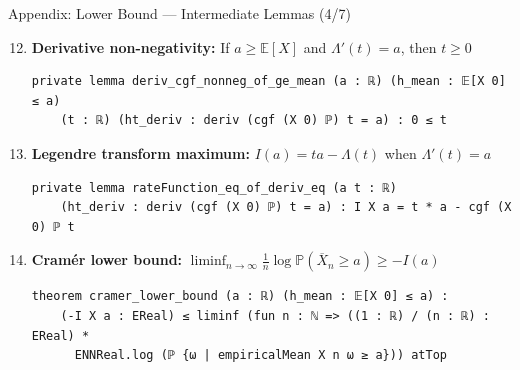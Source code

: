 \documentclass[aspectratio=169]{beamer}
\newcommand{\E}{\mathbb{E}}
\renewcommand{\P}{\mathbb{P}}
\begin{document}
\begin{frame}[fragile]{Appendix: Lower Bound --- Intermediate Lemmas (4/7)}
  \begin{enumerate}\setcounter{enumi}{11}
    \item \textbf{Derivative non-negativity:} If $a \ge \E[X]$ and $\Lambda'(t) = a$, then $t \ge 0$
\begin{lstlisting}[basicstyle=\ttfamily\tiny]
private lemma deriv_cgf_nonneg_of_ge_mean (a : ℝ) (h_mean : 𝔼[X 0] ≤ a)
    (t : ℝ) (ht_deriv : deriv (cgf (X 0) ℙ) t = a) : 0 ≤ t
\end{lstlisting}
    \item \textbf{Legendre transform maximum:} $I(a) = ta - \Lambda(t)$ when $\Lambda'(t) = a$
\begin{lstlisting}[basicstyle=\ttfamily\tiny]
private lemma rateFunction_eq_of_deriv_eq (a t : ℝ)
    (ht_deriv : deriv (cgf (X 0) ℙ) t = a) : I X a = t * a - cgf (X 0) ℙ t
\end{lstlisting}
    \item \textbf{Cram\'er lower bound:} $\liminf_{n\to\infty} \frac{1}{n}\log\P(\overline{X}_n \ge a) \ge -I(a)$
\begin{lstlisting}[basicstyle=\ttfamily\tiny]
theorem cramer_lower_bound (a : ℝ) (h_mean : 𝔼[X 0] ≤ a) :
    (-I X a : EReal) ≤ liminf (fun n : ℕ => ((1 : ℝ) / (n : ℝ) : EReal) *
      ENNReal.log (ℙ {ω | empiricalMean X n ω ≥ a})) atTop
\end{lstlisting}
  \end{enumerate}
\end{frame}
\end{document}
